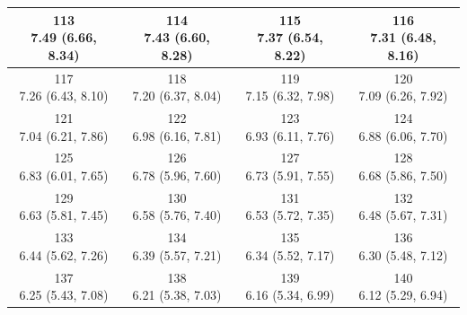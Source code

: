\begin{table}[htbp]
\begin{tabular}{cccc}
\shortstack[c]{113\\7.49 (6.66, 8.34)} & \shortstack[c]{114\\7.43 (6.60, 8.28)} & \shortstack[c]{115\\7.37 (6.54, 8.22)} & \shortstack[c]{116\\7.31 (6.48, 8.16)} \\
\hline
\shortstack[c]{117\\7.26 (6.43, 8.10)} & \shortstack[c]{118\\7.20 (6.37, 8.04)} & \shortstack[c]{119\\7.15 (6.32, 7.98)} & \shortstack[c]{120\\7.09 (6.26, 7.92)} \\
\hline
\shortstack[c]{121\\7.04 (6.21, 7.86)} & \shortstack[c]{122\\6.98 (6.16, 7.81)} & \shortstack[c]{123\\6.93 (6.11, 7.76)} & \shortstack[c]{124\\6.88 (6.06, 7.70)} \\
\hline
\shortstack[c]{125\\6.83 (6.01, 7.65)} & \shortstack[c]{126\\6.78 (5.96, 7.60)} & \shortstack[c]{127\\6.73 (5.91, 7.55)} & \shortstack[c]{128\\6.68 (5.86, 7.50)} \\
\hline
\shortstack[c]{129\\6.63 (5.81, 7.45)} & \shortstack[c]{130\\6.58 (5.76, 7.40)} & \shortstack[c]{131\\6.53 (5.72, 7.35)} & \shortstack[c]{132\\6.48 (5.67, 7.31)} \\
\hline
\shortstack[c]{133\\6.44 (5.62, 7.26)} & \shortstack[c]{134\\6.39 (5.57, 7.21)} & \shortstack[c]{135\\6.34 (5.52, 7.17)} & \shortstack[c]{136\\6.30 (5.48, 7.12)} \\
\hline
\shortstack[c]{137\\6.25 (5.43, 7.08)} & \shortstack[c]{138\\6.21 (5.38, 7.03)} & \shortstack[c]{139\\6.16 (5.34, 6.99)} & \shortstack[c]{140\\6.12 (5.29, 6.94)} \\
\hline

\end{tabular}
\end{table}
